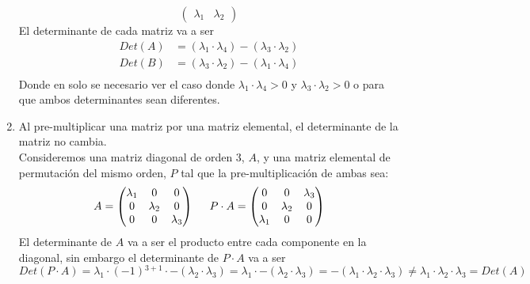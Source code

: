 \begin{enumerate}[label=\listAlph]
\[\begin{pmatrix}
                    \lambda_1 & \lambda_2
                \end{pmatrix}
            \]
            El determinante de cada matriz va a ser
            \[
                \begin{aligned}
                    Det(A) &= (\lambda_1 \cdot \lambda_4) - (\lambda_3 \cdot \lambda_2) \\
                    Det(B) &= (\lambda_3 \cdot \lambda_2) - (\lambda_1 \cdot \lambda_4) \\
                \end{aligned}
            \]
            Donde en solo se necesario ver el caso donde \(\lambda_1 \cdot \lambda_4 > 0\) y \(\lambda_3 \cdot \lambda_2 > 0\) o 
            para que ambos determinantes sean diferentes.
        \item Al pre-multiplicar una matriz por una matriz elemental, el determinante de la matriz no cambia. \\
            Consideremos una matriz diagonal de orden 3, \(A\), y una matriz elemental de permutación del mismo orden, \(P\) tal que la pre-multiplicación
            de ambas sea:
            \[
                A = 
                \begin{pmatrix}
                    \lambda_1 & 0 & 0 \\
                    0 & \lambda_2 & 0 \\
                    0 & 0 & \lambda_3
                \end{pmatrix}
                \hspace{0.5cm}
                P \cdot A = 
                \begin{pmatrix}
                    0 & 0 & \lambda_3 \\
                    0 & \lambda_2 & 0 \\
                    \lambda_1 & 0 & 0
                \end{pmatrix}
            \]
            El determinante de \(A\) va a ser el producto entre cada componente en la diagonal, sin embargo el determinante de 
            \(P \cdot A\) va a ser
            \[
                Det(P \cdot A) 
                = \lambda_1 \cdot \left(-1\right){}^{3 + 1} \cdot -(\lambda_2 \cdot \lambda_3)
                = \lambda_1 \cdot -(\lambda_2 \cdot \lambda_3)
                = -(\lambda_1 \cdot \lambda_2 \cdot \lambda_3)
                \neq \lambda_1 \cdot \lambda_2 \cdot \lambda_3 = Det(A)
            \]
    \end{enumerate}
